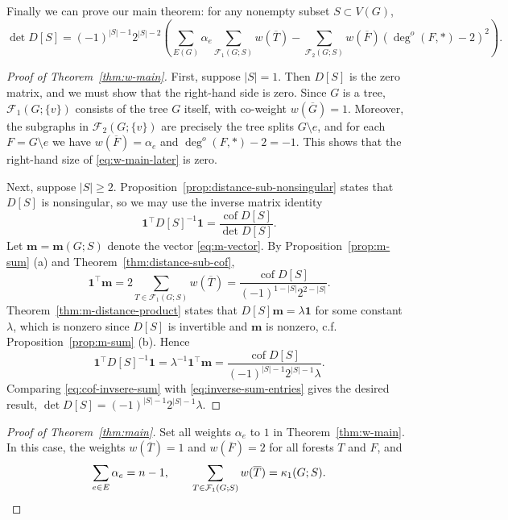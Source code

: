 \documentclass{amsart}
\theoremstyle{definition}
\newcommand{\bone}{\mathbf{1}}
\newcommand{\boldm}{\mathbf{m}}
\newcommand{\tr}{\intercal}
\DeclareMathOperator{\cof}{cof}
\newcommand{\trees}{\mathcal{F}_1}
\newcommand{\forests}{\mathcal{F}}
\newcommand{\degout}{\deg^o}
\begin{document}
Finally we can prove our main theorem: for any nonempty subset $S \subset V(G)$,
\begin{equation}
\label{eq:w-main-later}
	\det D[S] = (-1)^{|S|-1} 2^{|S|-2} \left( \sum_{E(G)}\alpha_e \sum_{\trees(G;S)} w(\overline{T}) - \sum_{\forests_2(G;S)} w(\overline{F}) (\degout(F,*) - 2)^2 \right).
\end{equation}
\begin{proof}[Proof of Theorem~\ref{thm:w-main}]
First, suppose $|S| = 1$.
Then $D[S]$ is the zero matrix, and we must show that the right-hand side is zero.
Since $G$ is a tree, $\trees(G; \{v\})$ consists of the tree $G$ itself, with co-weight $w(\overline{G}) = 1$.
Moreover, the subgraphs in $\forests_2(G; \{v\})$ are precisely the tree splits $G \setminus e$, and for each $F = G \setminus e$ we have 
$w(\overline{F}) = \alpha_e$ and
$\degout(F, *) - 2 = -1$.
This shows that the right-hand size of \eqref{eq:w-main-later} is zero.

Next, suppose $|S| \geq 2$.
Proposition~\ref{prop:distance-sub-nonsingular} states that $D[S]$ is nonsingular, so we may use the inverse matrix identity
\begin{equation}\label{eq:cof-invsere-sum}
	\bone^\tr D[S]^{-1} \bone =
	\frac{\cof D[S]}{\det D[S]}. 
\end{equation}
Let $\boldm = \boldm(G; S)$ denote the vector \eqref{eq:m-vector}.
By 
Proposition~\ref{prop:m-sum} (a) and
Theorem~\ref{thm:distance-sub-cof},
\[
	\bone^\tr \boldm 
	= 2 \sum_{T \in \trees(G;S)} w(\overline{T})
	= \frac{\cof D[S]}{(-1)^{1 - |S|} 2^{2 - |S|} }.
\]
Theorem~\ref{thm:m-distance-product} states that $D[S] \boldm = \lambda \bone$
for some constant $\lambda$,
which is nonzero since $D[S]$ is invertible and $\boldm$ is nonzero, c.f. Proposition~\ref{prop:m-sum} (b).
Hence
\begin{equation}\label{eq:inverse-sum-entries}
	\bone^\tr D[S]^{-1} \bone
	= \lambda^{-1} \bone^\tr \boldm
	= \frac{\cof D[S]}{(-1)^{|S| - 1} 2^{|S| - 1} \lambda} .
\end{equation}
Comparing \eqref{eq:cof-invsere-sum} with \eqref{eq:inverse-sum-entries} gives the desired result,
$\det D[S] = (-1)^{|S| - 1} 2^{|S| - 1} \lambda$.
\end{proof}

\begin{proof}[Proof of Theorem~\ref{thm:main}]
Set all weights $\alpha_e$ to $1$ in Theorem~\ref{thm:w-main}.
In this case, the weights $w(\overline{T}) = 1$ and $w(\overline{F}) = 2$ for all forests $T$ and $F$,
and 
\[
	\sum_{e \in E} \alpha_e = n - 1, 
	\qquad \sum_{T \in \trees(G;S)} w(\overline{T}) = \kappa_1(G; S).
	\qedhere
\]
\end{proof}
\end{document}
